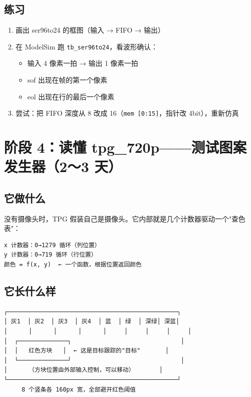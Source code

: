 \documentclass[11pt]{ctexart}
\begin{document}
\subsection{练习}

\begin{enumerate}
  \item 画出 ser96to24 的框图（输入 → FIFO → 输出）
  \item 在 ModelSim 跑 \texttt{tb\_ser96to24}，看波形确认：
  \begin{itemize}
    \item 输入 4 像素一拍 → 输出 1 像素一拍
    \item sof 出现在帧的第一个像素
    \item eol 出现在行的最后一个像素
  \end{itemize}
  \item 尝试：把 FIFO 深度从 8 改成 16（\texttt{mem [0:15]}，指针改 4bit），重新仿真
\end{enumerate}

\section{阶段 4：读懂 tpg\_720p——测试图案发生器（2～3 天）}

\subsection{它做什么}

没有摄像头时，TPG 假装自己是摄像头。它内部就是几个计数器驱动一个"查色表"：

\begin{Verbatim}[frame=single,fontsize=\small]
x 计数器：0→1279 循环（列位置）
y 计数器：0→719 循环（行位置）
颜色 = f(x, y)  ← 一个函数，根据位置返回颜色
\end{Verbatim}

\subsection{它长什么样}

\begin{Verbatim}[frame=single,fontsize=\small]
┌────────────────────────────────────────────────┐
│ 灰1  │ 灰2  │ 灰3  │ 灰4  │ 蓝  │ 绿  │ 深绿│ 深蓝│
│      │      │      │      │     │     │     │     │
│  ┌──────────────┐                               │
│  │   红色方块   │  ← 这是目标跟踪的"目标"       │
│  └──────────────┘                               │
│      （方块位置由外部输入控制，可以移动）       │
└────────────────────────────────────────────────┘
     8 个竖条各 160px 宽，全部避开红色阈值
\end{Verbatim}
\end{document}
